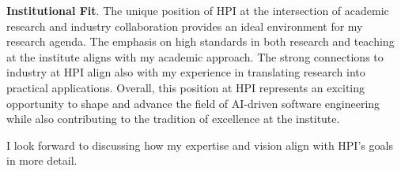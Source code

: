 \textbf{Institutional Fit}. 
The unique position of HPI at the intersection of academic research and industry collaboration provides an ideal environment for my research agenda. 
The emphasis on high standards in both research and teaching at the institute aligns with my academic approach.
The strong connections to industry at HPI align also with my experience in translating research into practical applications. 
Overall, this position at HPI represents an exciting opportunity to shape and advance the field of AI-driven software engineering while also contributing to the tradition of excellence at the institute.

I look forward to discussing how my expertise and vision align with HPI's goals in more detail.